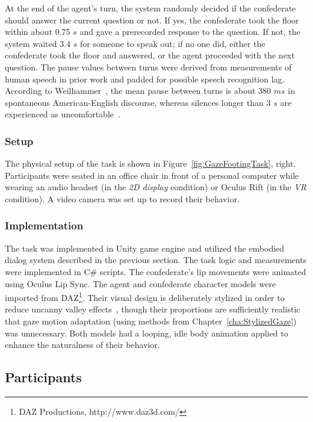 At the end of the agent's turn, the system randomly decided if the confederate should answer the current question or not. If yes, the confederate took the floor within about 0.75 $s$ and gave a prerecorded response to the question. If not, the system waited 3.4 $s$ for someone to speak out; if no one did, either the confederate took the floor and answered, or the agent proceeded with the next question. The pause values between turns were derived from measurements of human speech in prior work and padded for possible speech recognition lag. According to Weilhammer~\citep{weilhammer2003durational}, the mean pause between turns is about 380 $ms$ in spontaneous American-English discourse, whereas silences longer than 3 $s$ are experienced as uncomfortable~\citep{mclaughlin1982awkward}.

\subsubsection{Setup}

The physical setup of the task is shown in Figure~\ref{fig:GazeFootingTask}, right. Participants were seated in an office chair in front of a personal computer while wearing an audio headset (in the \emph{2D display} condition) or Oculus Rift (in the \emph{VR} condition). A video camera was set up to record their behavior.

\subsubsection{Implementation}

The task was implemented in Unity game engine and utilized the embodied dialog system described in the previous section. The task logic and measurements were implemented in C\# scripts. The confederate's lip movements were animated using Oculus Lip Sync. The agent and confederate character models were imported from DAZ\footnote{DAZ Productions, http://www.daz3d.com/}. Their visual design is deliberately stylized in order to reduce uncanny valley effects~\citep{mori2012uncanny}, though their proportions are sufficiently realistic that gaze motion adaptation (using methods from Chapter~\ref{cha:StylizedGaze}) was unnecessary. Both models had a looping, idle body animation applied to enhance the naturalness of their behavior.

\subsection{Participants}

